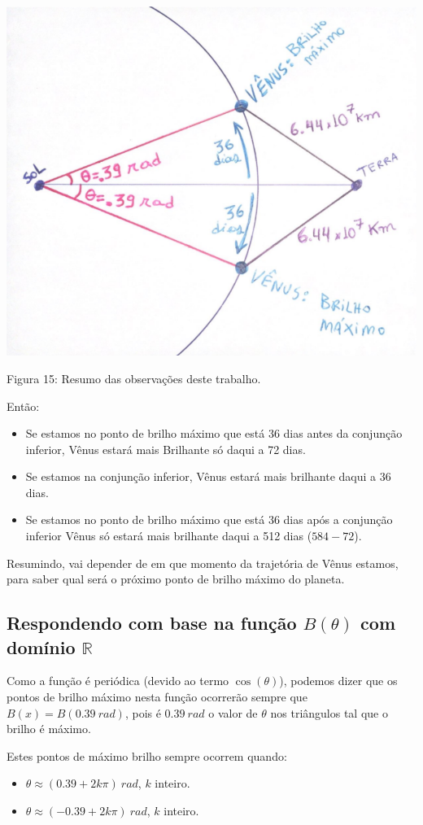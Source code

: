 \documentclass[a4paper, 12pt]{article}
\begin{document}
\begin{center}
    \includegraphics[width=14cm]{15-resumo.PNG}
    
    Figura 15: Resumo das observações deste trabalho.
    
\end{center}

Então: 

\begin{itemize}
  \item Se estamos no ponto de brilho máximo que está 36 dias antes da conjunção inferior, Vênus estará mais Brilhante só daqui a 72 dias.
  \item Se estamos na conjunção inferior, Vênus estará mais brilhante daqui a 36 dias.
  \item Se estamos no ponto de brilho máximo que está 36 dias após a conjunção inferior Vênus só estará mais brilhante daqui a 512 dias ($584 - 72$).
\end{itemize}

Resumindo, vai depender de em que momento da trajetória de Vênus estamos, para saber qual será o próximo ponto de brilho máximo do planeta.

\subsection{Respondendo com base na função $B\left(\theta \right)$ com domínio $\mathbb{R}$}

Como a função é periódica (devido ao termo $\cos \left(\theta \right)$), podemos dizer que os pontos de brilho máximo nesta função ocorrerão sempre que $B\left(x \right) = B\left(0.39\ rad \right)$, pois é $0.39\ rad$ o valor de $\theta$ nos triângulos tal que o brilho é máximo.

Estes pontos de máximo brilho sempre ocorrem quando:
\begin{itemize}
  \item $\theta \approx (0.39 + 2k\pi)\ rad$, $k$ inteiro.
  \item $\theta \approx (-0.39 + 2k\pi)\ rad$, $k$ inteiro.
\end{itemize}




\end{document}
